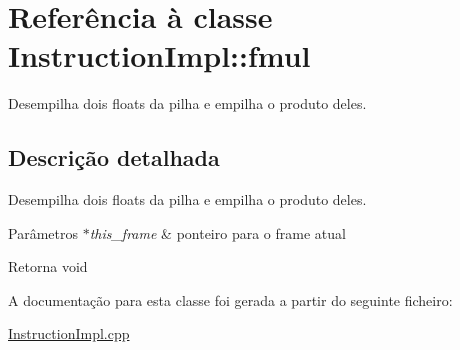 \hypertarget{class_instruction_impl_1_1fmul}{}\section{Referência à classe Instruction\+Impl\+:\+:fmul}
\label{class_instruction_impl_1_1fmul}


Desempilha dois floats da pilha e empilha o produto deles.  




\subsection{Descrição detalhada}
Desempilha dois floats da pilha e empilha o produto deles. 


\begin{DoxyParams}{Parâmetros}
{\em $\ast$this\+\_\+frame} & ponteiro para o frame atual \\
\hline
\end{DoxyParams}
\begin{DoxyReturn}{Retorna}
void 
\end{DoxyReturn}


A documentação para esta classe foi gerada a partir do seguinte ficheiro\+:\begin{DoxyCompactItemize}
\item 
\hyperlink{_instruction_impl_8cpp}{Instruction\+Impl.\+cpp}\end{DoxyCompactItemize}

